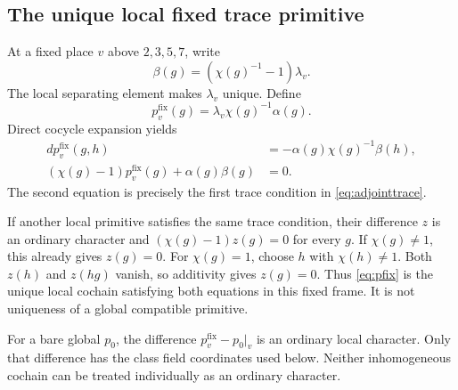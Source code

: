 \subsection{The unique local fixed trace primitive}
At a fixed place $v$ above $2,3,5,7$, write
\[
\beta(g)=(\chi(g)^{-1}-1)\lambda_v.
\]
The local separating element makes $\lambda_v$ unique. Define
\begin{equation}\label{eq:pfix}
p_v^{\mathrm{fix}}(g)=\lambda_v\chi(g)^{-1}\alpha(g).
\end{equation}
Direct cocycle expansion yields
\begin{align}
dp_v^{\mathrm{fix}}(g,h)&=-\alpha(g)\chi(g)^{-1}\beta(h),\label{eq:pfixdiff}\\
(\chi(g)-1)p_v^{\mathrm{fix}}(g)+\alpha(g)\beta(g)&=0.\label{eq:pfixtrace}
\end{align}
The second equation is precisely the first trace condition in \eqref{eq:adjointtrace}.

If another local primitive satisfies the same trace condition, their difference $z$ is an ordinary character and $(\chi(g)-1)z(g)=0$ for every $g$. If $\chi(g)\ne1$, this already gives $z(g)=0$. For $\chi(g)=1$, choose $h$ with $\chi(h)\ne1$. Both $z(h)$ and $z(hg)$ vanish, so additivity gives $z(g)=0$. Thus \eqref{eq:pfix} is the unique local cochain satisfying both equations in this fixed frame. It is not uniqueness of a global compatible primitive.

For a bare global $p_0$, the difference $p_v^{\mathrm{fix}}-p_0|_v$ is an ordinary local character. Only that difference has the class field coordinates used below. Neither inhomogeneous cochain can be treated individually as an ordinary character.
